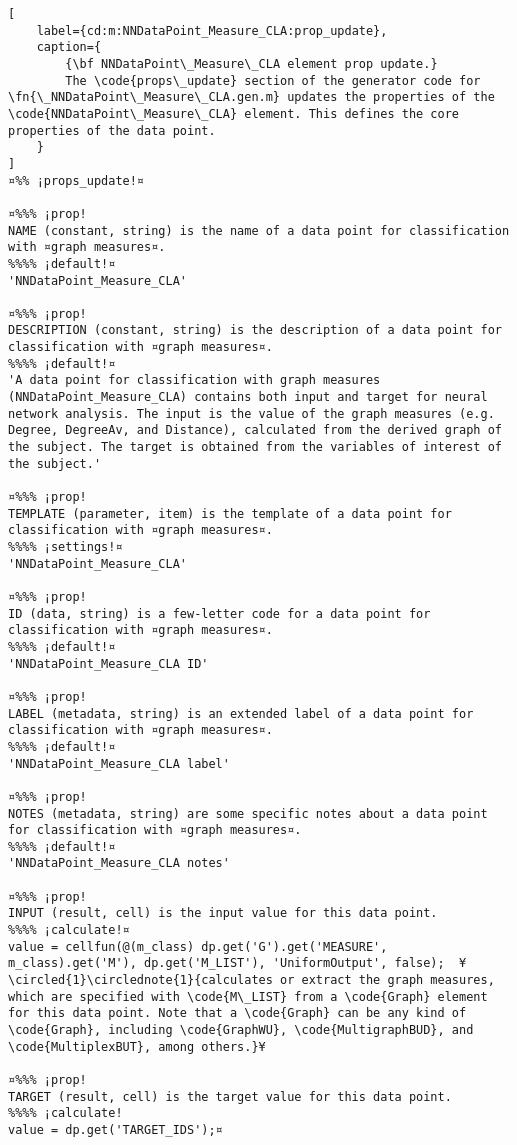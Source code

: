 \documentclass{tufte-handout}
\begin{document}
\begin{lstlisting}[
	label={cd:m:NNDataPoint_Measure_CLA:prop_update},
	caption={
		{\bf NNDataPoint\_Measure\_CLA element prop update.}
		The \code{props\_update} section of the generator code for \fn{\_NNDataPoint\_Measure\_CLA.gen.m} updates the properties of the \code{NNDataPoint\_Measure\_CLA} element. This defines the core properties of the data point.
	}
]
¤%% ¡props_update!¤

¤%%% ¡prop!
NAME (constant, string) is the name of a data point for classification with ¤graph measures¤.
%%%% ¡default!¤
'NNDataPoint_Measure_CLA'

¤%%% ¡prop!
DESCRIPTION (constant, string) is the description of a data point for classification with ¤graph measures¤.
%%%% ¡default!¤
'A data point for classification with graph measures (NNDataPoint_Measure_CLA) contains both input and target for neural network analysis. The input is the value of the graph measures (e.g. Degree, DegreeAv, and Distance), calculated from the derived graph of the subject. The target is obtained from the variables of interest of the subject.'

¤%%% ¡prop!
TEMPLATE (parameter, item) is the template of a data point for classification with ¤graph measures¤.
%%%% ¡settings!¤
'NNDataPoint_Measure_CLA'

¤%%% ¡prop!
ID (data, string) is a few-letter code for a data point for classification with ¤graph measures¤.
%%%% ¡default!¤
'NNDataPoint_Measure_CLA ID'

¤%%% ¡prop!
LABEL (metadata, string) is an extended label of a data point for classification with ¤graph measures¤.
%%%% ¡default!¤
'NNDataPoint_Measure_CLA label'

¤%%% ¡prop!
NOTES (metadata, string) are some specific notes about a data point for classification with ¤graph measures¤.
%%%% ¡default!¤
'NNDataPoint_Measure_CLA notes'

¤%%% ¡prop!
INPUT (result, cell) is the input value for this data point.
%%%% ¡calculate!¤ 
value = cellfun(@(m_class) dp.get('G').get('MEASURE', m_class).get('M'), dp.get('M_LIST'), 'UniformOutput', false);  ¥\circled{1}\circlednote{1}{calculates or extract the graph measures, which are specified with \code{M\_LIST} from a \code{Graph} element for this data point. Note that a \code{Graph} can be any kind of \code{Graph}, including \code{GraphWU}, \code{MultigraphBUD}, and \code{MultiplexBUT}, among others.}¥
    
¤%%% ¡prop!
TARGET (result, cell) is the target value for this data point.
%%%% ¡calculate!
value = dp.get('TARGET_IDS');¤

\end{lstlisting}
\end{document}
